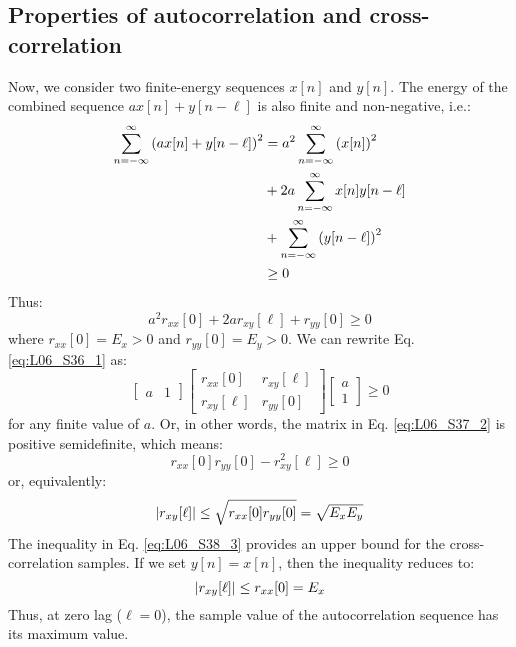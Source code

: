 \documentclass[../../main/main.tex]{subfiles}
\begin{document}
\subsection{Properties of autocorrelation and cross-correlation}
Now, we consider two finite-energy sequences \( x[n] \) and \( y[n] \). The energy of the combined sequence \( ax[n] + y[n-\ell] \) is also finite and non-negative, i.e.:
\begin{align}
    \sum_{n=-\infty}^{\infty} \qty(ax[n] + y[n-\ell])^{2}
    &=
    a^{2} \sum_{n=-\infty}^{\infty} \qty(x[n])^{2}  \nonumber   \\
    &+
    2a \sum_{n=-\infty}^{\infty} x[n]y[n-\ell]  \nonumber   \\
    &+
    \sum_{n=-\infty}^{\infty} \qty(y[n-\ell])^{2}   \nonumber   \\
    &\ge
    0
    \label{eq:L06_S36_1}
\end{align}
Thus:
\begin{equation}
    a^{2} r_{xx}[0] + 2a r_{xy}[\ell] + r_{yy}[0]
    \ge
    0
    \label{eq:L06_S37_1}
\end{equation}
where \( r_{xx}[0] = E_{x} > 0 \) and \( r_{yy}[0] = E_{y} > 0 \). We can rewrite Eq. \ref{eq:L06_S36_1} as:
\begin{equation}
    \begin{bmatrix}
        a   &   1
    \end{bmatrix}
    \begin{bmatrix}
        r_{xx}[0]   &   r_{xy}[\ell]    \\
        r_{xy}[\ell]&   r_{yy}[0]
    \end{bmatrix}
    \begin{bmatrix}
        a   \\
        1
    \end{bmatrix}
    \ge
    0
    \label{eq:L06_S37_2}
\end{equation}
for any finite value of \( a \). Or, in other words, the matrix in Eq. \ref{eq:L06_S37_2} is positive semidefinite, which means:
\begin{equation}
    r_{xx}[0] r_{yy}[0] - r^{2}_{xy}[\ell]
    \ge
    0
    \label{eq:L06_S38_2}
\end{equation}
or, equivalently:
\begin{equation}
    \abs{r_{xy}[\ell]}
    \le
    \sqrt{r_{xx}[0] r_{yy}[0]}
    =
    \sqrt{E_{x} E_{y}}
    \label{eq:L06_S38_3}
\end{equation}
The inequality in Eq. \ref{eq:L06_S38_3} provides an upper bound for the cross-correlation samples. If we set \( y[n] = x[n] \), then the inequality reduces to:
\begin{equation}
    \abs{r_{xy}[\ell]}
    \le
    r_{xx}[0]
    =
    E_{x}
    \label{eq:L06_S39_1}
\end{equation}
Thus, at zero lag (\( \ell = 0 \)), the sample value of the autocorrelation sequence has its maximum value.
\end{document}
